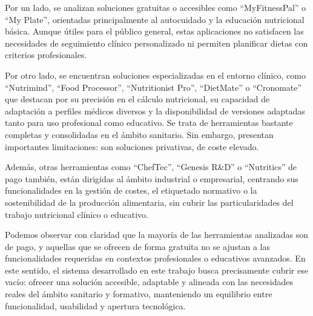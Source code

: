 Por un lado, se analizan soluciones gratuitas o accesibles como ``MyFitnessPal'' o ``My Plate'', orientadas principalmente al autocuidado y la educación nutricional básica. Aunque útiles para el público general, estas aplicaciones no satisfacen las necesidades de seguimiento clínico personalizado ni permiten planificar dietas con criterios profesionales.

Por otro lado, se encuentran soluciones especializadas en el entorno clínico, como ``Nutrimind'', ``Food Processor'', ``Nutritionist Pro'', ``DietMate'' o ``Cronomate''  que destacan por su precisión en el cálculo nutricional, su capacidad de adaptación a perfiles médicos diversos y la disponibilidad de versiones adaptadas tanto para uso profesional como educativo. Se trata de herramientas bastante completas y consolidadas en el ámbito sanitario. Sin embargo, presentan importantes limitaciones: son soluciones privativas, de coste elevado.

Además, otras herramientas como ``ChefTec'', ``Genesis R\&D'' o ``Nutritics'' de pago también, están dirigidas al ámbito industrial o empresarial, centrando sus funcionalidades en la gestión de costes, el etiquetado normativo o la sostenibilidad de la producción alimentaria, sin cubrir las particularidades del trabajo nutricional clínico o educativo.

Podemos observar con claridad que la mayoría de las herramientas analizadas son de pago, y aquellas que se ofrecen de forma gratuita no se ajustan a las funcionalidades requeridas en contextos profesionales o educativos avanzados. En este sentido, el sistema desarrollado en este trabajo busca precisamente cubrir ese vacío: ofrecer una solución accesible, adaptable y alineada con las necesidades reales del ámbito sanitario y formativo, manteniendo un equilibrio entre funcionalidad, usabilidad y apertura tecnológica.


